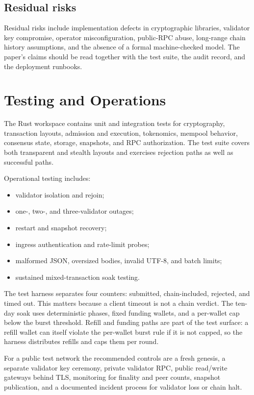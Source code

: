 \documentclass[11pt,a4paper]{article}
\begin{document}
\subsection{Residual risks}

Residual risks include implementation defects in cryptographic libraries,
validator key compromise, operator misconfiguration, public-RPC abuse,
long-range chain history assumptions, and the absence of a formal
machine-checked model. The paper's claims should be read together with the
test suite, the audit record, and the deployment runbooks.

\section{Testing and Operations}

The Rust workspace contains unit and integration tests for cryptography,
transaction layouts, admission and execution, tokenomics, mempool behavior,
consensus state, storage, snapshots, and RPC authorization. The test suite
covers both transparent and stealth layouts and exercises rejection paths as
well as successful paths.

Operational testing includes:
\begin{itemize}[leftmargin=*]
  \item validator isolation and rejoin;
  \item one-, two-, and three-validator outages;
  \item restart and snapshot recovery;
  \item ingress authentication and rate-limit probes;
  \item malformed JSON, oversized bodies, invalid UTF-8, and batch limits;
  \item sustained mixed-transaction soak testing.
\end{itemize}

The test harness separates four counters: submitted, chain-included, rejected,
and timed out. This matters because a client timeout is not a chain verdict.
The ten-day soak uses deterministic phases, fixed funding wallets, and a
per-wallet cap below the burst threshold. Refill and funding paths are part of
the test surface: a refill wallet can itself violate the per-wallet burst rule
if it is not capped, so the harness distributes refills and caps them per
round.

For a public test network the recommended controls are a fresh genesis, a
separate validator key ceremony, private validator RPC, public read/write
gateways behind TLS, monitoring for finality and peer counts, snapshot
publication, and a documented incident process for validator loss or chain
halt.
\end{document}
